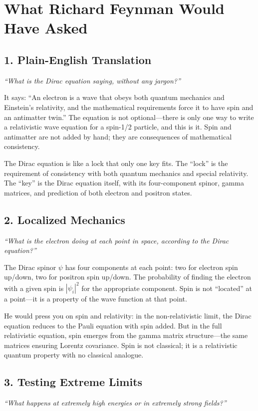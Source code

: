 \documentclass[11pt,openright]{book}
\begin{document}
\section*{What Richard Feynman Would Have Asked}

\subsection*{1. Plain-English Translation}
\textit{``What is the Dirac equation saying, without any jargon?''}

It says: ``An electron is a wave that obeys both quantum mechanics and Einstein's relativity, and the mathematical requirements force it to have spin and an antimatter twin.'' The equation is not optional---there is only one way to write a relativistic wave equation for a spin-1/2 particle, and this is it. Spin and antimatter are not added by hand; they are consequences of mathematical consistency.

The Dirac equation is like a lock that only one key fits. The ``lock'' is the requirement of consistency with both quantum mechanics and special relativity. The ``key'' is the Dirac equation itself, with its four-component spinor, gamma matrices, and prediction of both electron and positron states.

\subsection*{2. Localized Mechanics}
\textit{``What is the electron doing at each point in space, according to the Dirac equation?''}

The Dirac spinor $\psi$ has four components at each point: two for electron spin up/down, two for positron spin up/down. The probability of finding the electron with a given spin is $|\psi_i|^2$ for the appropriate component. Spin is not ``located'' at a point---it is a property of the wave function at that point.

He would press you on spin and relativity: in the non-relativistic limit, the Dirac equation reduces to the Pauli equation with spin added. But in the full relativistic equation, spin emerges from the gamma matrix structure---the same matrices ensuring Lorentz covariance. Spin is not classical; it is a relativistic quantum property with no classical analogue.

\subsection*{3. Testing Extreme Limits}
\textit{``What happens at extremely high energies or in extremely strong fields?''}
\end{document}
